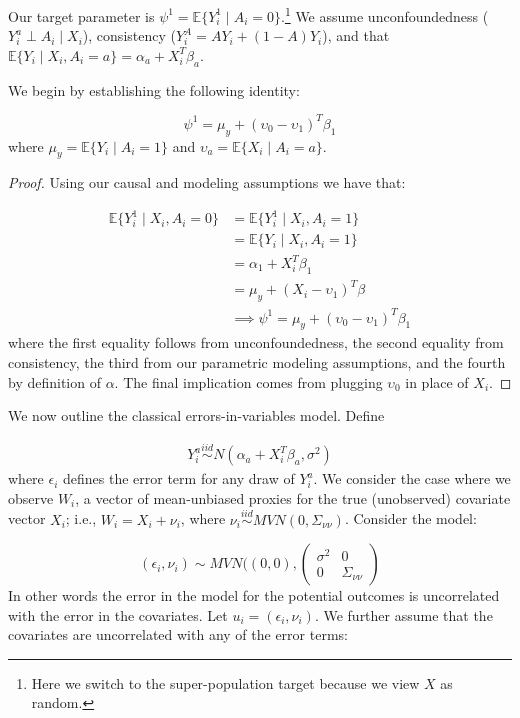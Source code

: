 Our target parameter is $\psi^1 = \mathbb{E}\{Y_i^1 \mid A_i = 0\}$.\footnote{Here we switch to the super-population target because we view $X$ as random.} We assume unconfoundedness ($Y_i^a \perp A_i \mid X_i$), consistency ($Y_i^A = AY_i + (1-A)Y_i$), and that $\mathbb{E}\{Y_i \mid X_i, A_i = a\} = \alpha_a + X_i^T\beta_a$. 

We begin by establishing the following identity:

\begin{equation}
\psi^1 = \mu_y + (\upsilon_0 - \upsilon_1)^T\beta_1
\end{equation}
%
where $\mu_y = \mathbb{E}\{Y_i \mid A_i = 1\}$ and $\upsilon_a = \mathbb{E}\{X_i \mid A_i = a\}$.

\begin{proof}

Using our causal and modeling assumptions we have that:

\begin{align*}
\mathbb{E}\{Y_i^1 \mid X_i, A_i = 0\} &= \mathbb{E}\{Y_i^1 \mid X_i, A_i = 1\} \\
&= \mathbb{E}\{Y_i \mid X_i, A_i = 1\} \\
&= \alpha_1 + X_i^T\beta_1 \\
&= \mu_y + (X_i - \upsilon_1)^T\beta \\
&\implies \psi^1 = \mu_y + (\upsilon_0 - \upsilon_1)^T\beta_1
\end{align*}
%
where the first equality follows from unconfoundedness, the second equality from consistency, the third from our parametric modeling assumptions, and the fourth by definition of $\alpha$. The final implication comes from plugging $\upsilon_0$ in place of $X_i$.
\end{proof}

We now outline the classical errors-in-variables model. Define 

\begin{align*}
Y_i^a \stackrel{iid}\sim N(\alpha_a + X_i^T\beta_a, \sigma^2)
\end{align*}
%
where $\epsilon_i$ defines the error term for any draw of $Y_i^a$. We consider the case where we observe $W_i$, a vector of mean-unbiased proxies for the true (unobserved) covariate vector $X_i$; i.e., $W_i = X_i + \nu_i$, where $\nu_i \stackrel{iid}\sim MVN(0, \Sigma_{\nu\nu})$. Consider the model:

\begin{equation}\label{eqn:errorcors}
(\epsilon_i, \nu_i) \sim MVN((0, 0), \begin{pmatrix} 
\sigma^2 & 0 \\ 
0 & \Sigma_{\nu\nu}  
\end{pmatrix}
\end{equation}
%
In other words the error in the model for the potential outcomes is uncorrelated with the error in the covariates. Let $u_i = (\epsilon_i, \nu_i)$. We further assume that the covariates are uncorrelated with any of the error terms:


